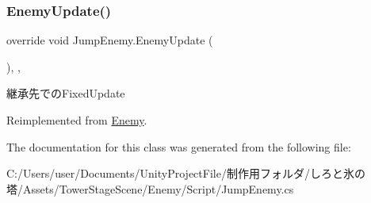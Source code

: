 \subsubsection{\texorpdfstring{Enemy\+Update()}{EnemyUpdate()}}
{\footnotesize\ttfamily override void Jump\+Enemy.\+Enemy\+Update (\begin{DoxyParamCaption}{ }\end{DoxyParamCaption})\hspace{0.3cm}{\ttfamily [inline]}, {\ttfamily [protected]}, {\ttfamily [virtual]}}



継承先での\+Fixed\+Update 



Reimplemented from \hyperlink{class_enemy_ab19a73003a5b443ba93f4b6a45c0abad}{Enemy}.



The documentation for this class was generated from the following file\+:\begin{DoxyCompactItemize}
\item 
C\+:/\+Users/user/\+Documents/\+Unity\+Project\+File/制作用フォルダ/しろと氷の塔/\+Assets/\+Tower\+Stage\+Scene/\+Enemy/\+Script/Jump\+Enemy.\+cs\end{DoxyCompactItemize}
